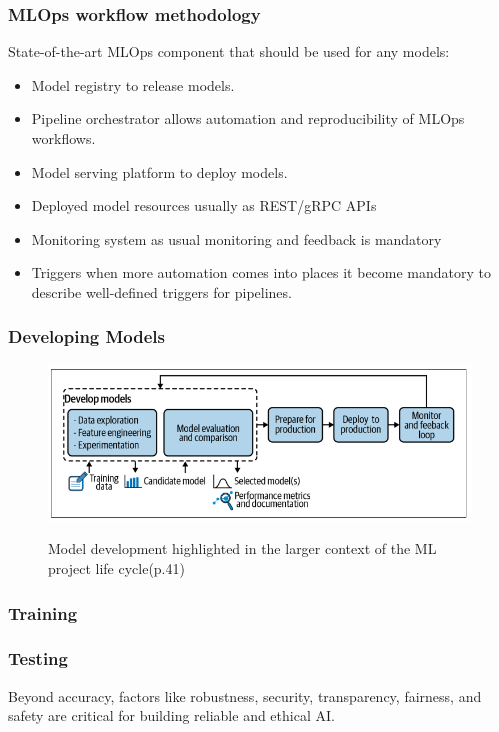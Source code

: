 \subsubsection{MLOps workflow methodology}
State-of-the-art MLOps component that should be used for any models\cite{BURGUENOROMERO2025107499}:
\begin{itemize}
    \item Model registry to release models.
    \item Pipeline orchestrator allows automation and reproducibility of MLOps workflows.
    \item Model serving platform to deploy models.
    \item Deployed model resources usually as REST/gRPC APIs
    \item Monitoring system as usual monitoring and feedback is mandatory
    \item Triggers when more automation comes into places it become mandatory to describe well-defined triggers for pipelines.
\end{itemize}

\subsubsection{Developing Models}
\begin{figure}[!htbp]
    \caption{Model development highlighted in the larger context of the ML project life
    cycle\cite{treveil2020introducing}(p.41)}
    \centering
    \includegraphics[scale=0.5]{images/developing-models-intro}
    \label{fig:developing-models-intro}
\end{figure}

\subsubsection{Training}

\subsubsection{Testing}
Beyond accuracy, factors like robustness, security, transparency, fairness, and safety are critical for building reliable and ethical AI\cite{10.1145/3555803}.

